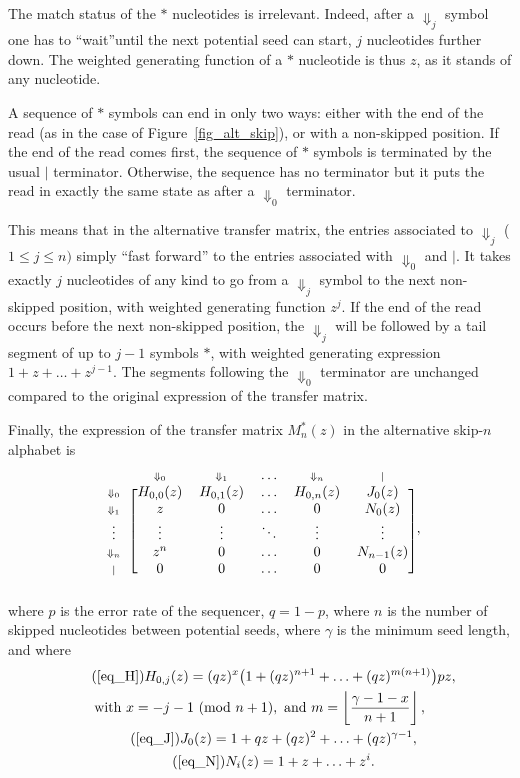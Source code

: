 \documentclass{article}
\newcommand{\Dn}[1]{\scriptstyle{\Downarrow_{#1}}}
\newcommand{\nd}{\scriptstyle{|}}
\newcommand{\modulo}[1]{\ (\mathrm{mod}\ #1)}
\begin{document}
The match status of the $*$ nucleotides is irrelevant. Indeed, after a
$\Downarrow_j$ symbol one has to ``wait''until the next potential seed can
start, $j$ nucleotides further down. The weighted generating function of a
$*$ nucleotide is thus $z$, as it stands of any nucleotide.

A sequence of $*$ symbols can end in only two ways: either with the end of
the read (as in the case of Figure~\ref{fig_alt_skip}), or with a
non-skipped position. If the end of the read comes first, the sequence of
$*$ symbols is terminated by the usual $|$ terminator. Otherwise, the
sequence has no terminator but it puts the read in exactly the same state
as after a $\Downarrow_0$ terminator.

This means that in the alternative transfer matrix, the entries associated
to $\Downarrow_j$ ($1 \leq j \leq n)$ simply ``fast forward'' to the
entries associated with $\Downarrow_0$ and $|$. It takes exactly $j$
nucleotides of any kind to go from a $\Downarrow_j$ symbol to the next
non-skipped position, with weighted generating function $z^j$. If the end
of the read occurs before the next non-skipped position, the
$\Downarrow_j$ will be followed by a tail segment of up to $j-1$ symbols
$*$, with weighted generating expression $1 + z + \ldots + z^{j-1}$. The
segments following the $\Downarrow_0$ terminator are unchanged compared to
the original expression of the transfer matrix.

Finally, the expression of  the transfer matrix $M_n^*(z)$ in the
alternative skip-$n$ alphabet is
\begin{equation}
\label{eq_alt_Mn}
\begin{blockarray}{cccccc}
   & \Dn{0} & \Dn{1} & \ldots & \Dn{n} & \nd \\
\begin{block}{c[ccccc]}
\Dn{0} & H_{0,0}(z) & H_{0,1}(z) & \ldots & H_{0,n}(z) & J_0(z) \\
\Dn{1} & z & 0 & \ldots & 0 & N_0(z) \\
\vdots & \vdots & \vdots & \ddots & \vdots & \vdots \\
\Dn{n} & z^n & 0 & \ldots & 0 & N_{n-1}(z) \\
\nd & 0 & 0 & \ldots & 0 & 0 \\
\end{block}
\end{blockarray},
\end{equation}
where $p$ is the error rate of the sequencer, $q=1-p$, where $n$ is the
number of skipped nucleotides between potential seeds, where $\gamma$ is
the minimum seed length, and where
\begin{gather}
\tag{\ref{eq_H}}
H_{0,j}(z) = (qz)^x\big( 1 + (qz)^{n+1} +
  \ldots + (qz)^{m(n+1)} \big) pz, \\
\notag
  \text{with } x = -j-1 \modulo{n+1},
  \text{ and } m = \left\lfloor
  \frac{\gamma-1-x}{n+1} \right\rfloor, \\
\tag{\ref{eq_J}}
J_0(z) = 1 + qz + (qz)^2 + \ldots + (qz)^{\gamma-1}, \\
\tag{\ref{eq_N}}
N_i(z) = 1+z+\ldots+z^i.
\end{gather}
\end{document}
